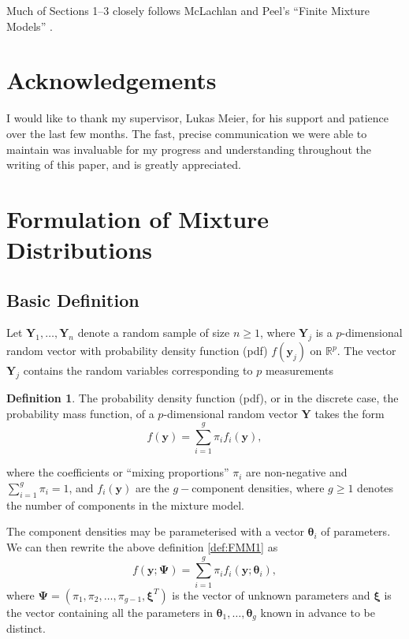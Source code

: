 \documentclass{article}\usepackage[]{graphicx}\usepackage[]{xcolor}
\theoremstyle{plain}
\theoremstyle{definition}
\newtheorem{definition}[theorem]{Definition}{}{}
\theoremstyle{remark}
\newcommand{\boldY}{\mathbf{Y}}
\newcommand{\boldy}{\mathbf{y}}
\newcommand{\boldtheta}{\boldsymbol{\theta}}
\newcommand{\boldPsi}{\boldsymbol{\Psi}}
\newcommand{\boldxi}{\boldsymbol{\xi}}
\begin{document}
Much of Sections 1--3 closely follows McLachlan and Peel's ``Finite Mixture Models'' \cite{FMMs_Book}.

\section*{Acknowledgements}

I would like to thank my supervisor, Lukas Meier, for his support and patience over the last few months. The fast, precise communication we were able to maintain was invaluable for my progress and understanding throughout the writing of this paper, and is greatly appreciated.

\newpage

\section{Formulation of Mixture Distributions} \label{sec:formulation}
\subsection{Basic Definition}
Let $\boldY_1, \dots, \boldY_n$ denote a random sample of size $n \geq 1$, where $\boldY_j$ is a $p$-dimensional random vector with probability density function (pdf) $ f(\mathbf{y}_j)$ on $\mathbb{R}^p$. The vector $\boldY_j$ contains the random variables corresponding to $p$ measurements    
\begin{definition} \label{def:FMM1}
    The probability density function (pdf), or in the discrete case, the probability mass function, of a $p$-dimensional random vector $\mathbf{Y}$ takes the form
    \begin{equation} \label{def:mixdistr1}
        f(\mathbf{y}) = \sum_{i=1}^g \pi_i f_i(\mathbf{y}),
    \end{equation}
\end{definition}
where the coefficients or ``mixing proportions'' $\pi_i$ are non-negative and $\sum_{i=1}^g \pi_i = 1$, and $f_i(\mathbf{y})$ are the $g-$component densities, where $g \geq 1$ denotes the number of components in the mixture model.

The component densities may be parameterised with a vector $\boldtheta_i$ of parameters. We can then rewrite the above definition \eqref{def:FMM1} as
\begin{equation} \label{def:parmix}
    f(\mathbf{y}; \mathbf{\Psi}) = \sum_{i=1}^g \pi_i f_i(\boldy ; \boldtheta_i),
\end{equation}
where $\boldPsi = (\pi_1, \pi_2, \dots, \pi_{g-1}, \boldxi^T)$ is the vector of unknown parameters and $\boldxi$ is the vector containing all the parameters in $\boldtheta_1, \dots, \boldtheta_g$ known in advance to be distinct.
\end{document}
